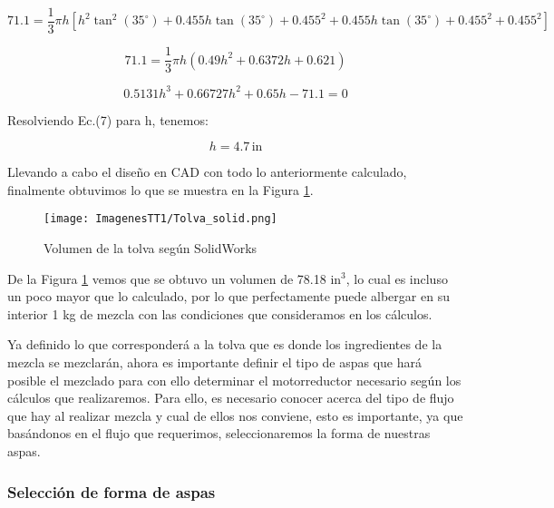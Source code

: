 \documentclass[14pt,oneside]{extarticle} %
\begin{document}
\begin{equation*}
   71.1 = \frac{1}{3}\pi h\left[h^2 \tan^2(35^\circ) + 0.455h\tan(35^\circ) + 0.455^2 + 0.455h\tan(35^\circ) + 0.455^2 + 0.455^2\right]
\end{equation*}

\begin{equation*}
    71.1 = \frac{1}{3}\pi h\left(0.49h^2 + 0.6372h + 0.621\right)
\end{equation*}

\begin{equation}
    0.5131h^3 + 0.66727h^2 + 0.65h - 71.1 = 0
\end{equation}

Resolviendo Ec.(7) para h, tenemos:

\begin{equation*}
    h = 4.7\, \text{in}
\end{equation*}

Llevando a cabo el diseño en CAD con todo lo anteriormente calculado, finalmente obtuvimos lo que se muestra en la Figura \ref{fig:Tolva_solid}.

\begin{figure}[H]
    \centering
    \texttt{[image: ImagenesTT1/Tolva\_solid.png]}
    \caption{Volumen de la tolva según SolidWorks\textregistered}
    \label{fig:Tolva_solid}
\end{figure}

De la Figura \ref{fig:Tolva_solid} vemos que se obtuvo un volumen de 78.18 $\text{in}^3$, lo cual es incluso un poco mayor que lo calculado, por lo que perfectamente puede albergar en su interior 1 kg de mezcla con las condiciones que consideramos en los cálculos.

Ya definido lo que corresponderá a la tolva que es donde los ingredientes de la mezcla se mezclarán, ahora es importante definir el tipo de aspas que hará posible el mezclado para con ello determinar el motorreductor necesario según los cálculos que realizaremos. Para ello, es necesario conocer acerca del tipo de flujo que hay al realizar mezcla y cual de ellos nos conviene, esto es importante, ya que basándonos en el flujo que requerimos, seleccionaremos la forma de nuestras aspas. 

\subsubsection{Selección de forma de aspas}
\end{document}
